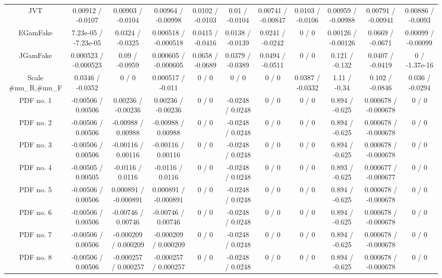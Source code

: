 \begin{table}[htbp]
\begin{center}
\begin{tabular}{|c|c|c|c|c|c|c|c|c|c|c|}
  JVT & 0.00912 / -0.0107 & 0.00903 / -0.0104 & 0.00964 / -0.00998 & 0.0102 / -0.0103 & 0.01 / -0.0104 & 0.00741 / -0.00847 & 0.0103 / -0.0106 & 0.00959 / -0.00988 & 0.00791 / -0.00941 & 0.00886 / -0.0093 \\ 
  EGamFake & 7.23e-05 / -7.23e-05 & 0.0324 / -0.0325 & 0.000518 / -0.000518 & 0.0415 / -0.0416 & 0.0138 / -0.0139 & 0.0241 / -0.0242 & 0 / 0 & 0.00126 / -0.00126 & 0.0669 / -0.0671 & 0.00099 / -0.00099 \\ 
  JGamFake & 0.000523 / -0.000523 & 0.09 / -0.0959 & 0.000605 / -0.000605 & 0.0658 / -0.0689 & 0.0379 / -0.0389 & 0.0494 / -0.0511 & 0 / 0 & 0.121 / -0.132 & 0.0407 / -0.0419 & 0 / -1.37e-16 \\ 
  Scale #mu_{R},#mu_{F} & 0.0346 / -0.0352 & 0 / 0 & 0.000517 / -0.011 & 0 / 0 & 0 / 0 & 0 / 0 & 0.0387 / -0.0332 & 1.11 / -0.34 & 0.102 / -0.0846 & 0.036 / -0.0294 \\ 
  PDF no. 1 & -0.00506 / 0.00506 & 0.00236 / -0.00236 & 0.00236 / -0.00236 & 0 / 0 & -0.0248 / 0.0248 & 0 / 0 & 0 / 0 & 0.894 / -0.625 & 0.000678 / -0.000678 & 0 / 0 \\ 
  PDF no. 2 & -0.00506 / 0.00506 & -0.00988 / 0.00988 & -0.00988 / 0.00988 & 0 / 0 & -0.0248 / 0.0248 & 0 / 0 & 0 / 0 & 0.894 / -0.625 & 0.000678 / -0.000678 & 0 / 0 \\ 
  PDF no. 3 & -0.00506 / 0.00506 & -0.00116 / 0.00116 & -0.00116 / 0.00116 & 0 / 0 & -0.0248 / 0.0248 & 0 / 0 & 0 / 0 & 0.894 / -0.625 & 0.000678 / -0.000678 & 0 / 0 \\ 
  PDF no. 4 & -0.00505 / 0.00505 & -0.0116 / 0.0116 & -0.0116 / 0.0116 & 0 / 0 & -0.0248 / 0.0248 & 0 / 0 & 0 / 0 & 0.893 / -0.625 & 0.000677 / -0.000677 & 0 / 0 \\ 
  PDF no. 5 & -0.00506 / 0.00506 & 0.000891 / -0.000891 & 0.000891 / -0.000891 & 0 / 0 & -0.0248 / 0.0248 & 0 / 0 & 0 / 0 & 0.894 / -0.625 & 0.000678 / -0.000678 & 0 / 0 \\ 
  PDF no. 6 & -0.00506 / 0.00506 & -0.00746 / 0.00746 & -0.00746 / 0.00746 & 0 / 0 & -0.0248 / 0.0248 & 0 / 0 & 0 / 0 & 0.894 / -0.625 & 0.000678 / -0.000678 & 0 / 0 \\ 
  PDF no. 7 & -0.00506 / 0.00506 & -0.000209 / 0.000209 & -0.000209 / 0.000209 & 0 / 0 & -0.0248 / 0.0248 & 0 / 0 & 0 / 0 & 0.894 / -0.625 & 0.000678 / -0.000678 & 0 / 0 \\ 
  PDF no. 8 & -0.00506 / 0.00506 & -0.000257 / 0.000257 & -0.000257 / 0.000257 & 0 / 0 & -0.0248 / 0.0248 & 0 / 0 & 0 / 0 & 0.894 / -0.625 & 0.000678 / -0.000678 & 0 / 0 \\ 

\end{tabular}
\end{center}
\end{table}
